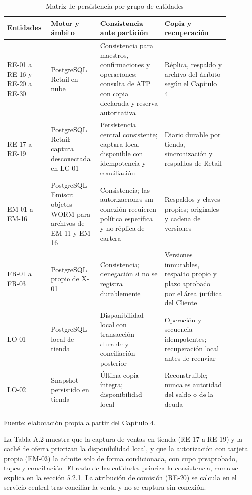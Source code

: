 \documentclass[11pt]{article}
\begin{document}
\begin{table}[htbp]
\caption{Matriz de persistencia por grupo de entidades}\label{tab:matriz}
\centering
\begin{tabular}{@{}p{0.171\linewidth}p{0.189\linewidth}p{0.271\linewidth}p{0.271\linewidth}@{}}
\toprule Entidades & Motor y ámbito & Consistencia ante partición & Copia y recuperación \\
\midrule
RE-01 a RE-16 y RE-20 a RE-30 & PostgreSQL Retail en nube & Consistencia para maestros, confirmaciones y operaciones; consulta de ATP con copia declarada y reserva autoritativa & Réplica, respaldo y archivo del ámbito según el Capítulo 4 \\
RE-17 a RE-19 & PostgreSQL Retail; captura desconectada en LO-01 & Persistencia central consistente; captura local disponible con idempotencia y conciliación & Diario durable por tienda, sincronización y respaldos de Retail \\
EM-01 a EM-16 & PostgreSQL Emisor; objetos WORM para archivos de EM-11 y EM-16 & Consistencia; las autorizaciones sin conexión requieren política específica y no réplica de cartera & Respaldos y claves propios; originales y cadena de versiones \\
FR-01 a FR-03 & PostgreSQL propio de X-01 & Consistencia; denegación si no se registra durablemente & Versiones inmutables, respaldo propio y plazo aprobado por el área jurídica del Cliente \\
LO-01 & PostgreSQL local de tienda & Disponibilidad local con transacción durable y conciliación posterior & Operación y secuencia idempotentes; recuperación local antes de reenviar \\
LO-02 & Snapshot persistido en tienda & Última copia íntegra; disponibilidad local & Reconstruible; nunca es autoridad del saldo o de la deuda \\
\bottomrule
\end{tabular}
\par\smallskip
{\raggedright Fuente: elaboración propia a partir del Capítulo 4.\par}
\end{table}

La Tabla A.2 muestra que la captura de ventas en tienda (RE-17 a RE-19) y la caché de oferta priorizan la disponibilidad local, y que la autorización con tarjeta propia (EM-03) la admite solo de forma condicionada, con cupo preaprobado, topes y conciliación. El resto de las entidades prioriza la consistencia, como se explica en la sección 5.2.1. La atribución de comisión (RE-20) se calcula en el servicio central tras conciliar la venta y no se captura sin conexión.
\end{document}
